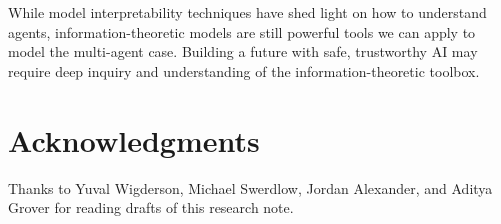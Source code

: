 \documentclass[11pt]{article}
\begin{document}
While model interpretability techniques \cite{hohman2018visual, koh2017understanding, olah2017feature} have shed light on how to understand agents, information-theoretic models are still powerful tools we can apply to model the multi-agent case.  Building a future with safe, trustworthy AI may require deep inquiry and understanding of the information-theoretic toolbox.

\newpage

\section*{Acknowledgments}

Thanks to Yuval Wigderson, Michael Swerdlow, Jordan Alexander, and Aditya Grover for reading drafts of this research note.


\nocite{*}

\end{document}
